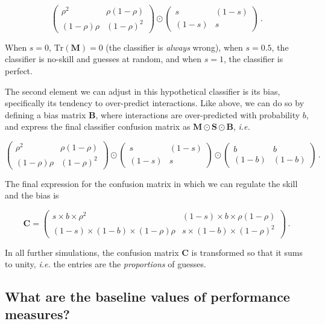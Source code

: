 \documentclass[10pt,oneside]{article}
\begin{document}
\[
\begin{pmatrix}
    \rho^2 & \rho (1-\rho) \\
    (1-\rho) \rho & (1-\rho)^2
\end{pmatrix} \odot \begin{pmatrix}
    s & (1-s) \\
    (1-s) & s
\end{pmatrix} \,.
\]

When \(s=0\), \(\text{Tr}(\mathbf{M}) = 0\) (the classifier is
\emph{always} wrong), when \(s=0.5\), the classifier is no-skill and
guesses at random, and when \(s=1\), the classifier is perfect.

The second element we can adjust in this hypothetical classifier is its
bias, specifically its tendency to over-predict interactions. Like
above, we can do so by defining a bias matrix \(\mathbf{B}\), where
interactions are over-predicted with probability \(b\), and express the
final classifier confusion matrix as
\(\mathbf{M}\odot \mathbf{S}\odot \mathbf{B}\), \emph{i.e.}

\[
\begin{pmatrix}
    \rho^2 & \rho (1-\rho) \\
    (1-\rho) \rho & (1-\rho)^2
\end{pmatrix} \odot \begin{pmatrix}
    s & (1-s) \\
    (1-s) & s
\end{pmatrix} \odot \begin{pmatrix}
    b & b \\
    (1-b) & (1-b)
\end{pmatrix}\,.
\]

The final expression for the confusion matrix in which we can regulate
the skill and the bias is

\[
\mathbf{C} = \begin{pmatrix}
    s\times b\times \rho^2 & (1-s)\times b\times \rho (1-\rho) \\
    (1-s)\times (1-b)\times (1-\rho) \rho & s\times (1-b)\times (1-\rho)^2
\end{pmatrix} \,.
\]

In all further simulations, the confusion matrix \(\mathbf{C}\) is
transformed so that it sums to unity, \emph{i.e.} the entries are the
\emph{proportions} of guesses.

\hypertarget{what-are-the-baseline-values-of-performance-measures}{%
\subsection{What are the baseline values of performance
measures?}\label{what-are-the-baseline-values-of-performance-measures}}
\end{document}
